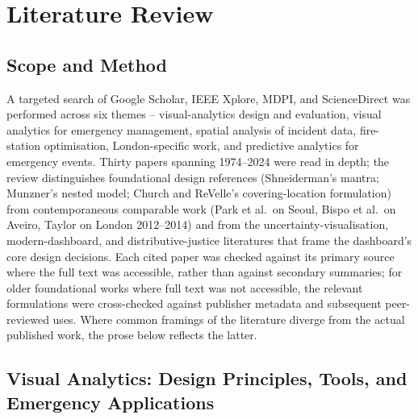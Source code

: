 \section{Literature Review}\label{sec:literature}

\subsection{Scope and Method}

A targeted search of Google Scholar, IEEE Xplore, MDPI, and ScienceDirect was performed across six themes -- visual-analytics design and evaluation, visual analytics for emergency management, spatial analysis of incident data, fire-station optimisation, London-specific work, and predictive analytics for emergency events. Thirty papers spanning 1974--2024 were read in depth; the review distinguishes foundational design references (Shneiderman's mantra; Munzner's nested model; Church and ReVelle's covering-location formulation) from contemporaneous comparable work (Park et al.\ on Seoul, Bispo et al.\ on Aveiro, Taylor on London 2012--2014) and from the uncertainty-visualisation, modern-dashboard, and distributive-justice literatures that frame the dashboard's core design decisions. Each cited paper was checked against its primary source where the full text was accessible, rather than against secondary summaries; for older foundational works where full text was not accessible, the relevant formulations were cross-checked against publisher metadata and subsequent peer-reviewed uses. Where common framings of the literature diverge from the actual published work, the prose below reflects the latter.

\subsection{Visual Analytics: Design Principles, Tools, and Emergency Applications}\label{sec:lit-va}

